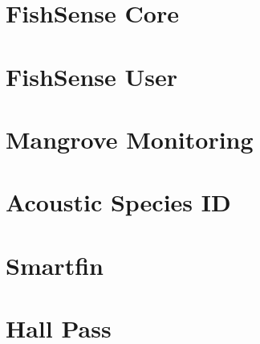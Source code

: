 \section{FishSense Core}

\section{FishSense User}

\section{Mangrove Monitoring}

\section{Acoustic Species ID}

\section{Smartfin}

\section{Hall Pass}

